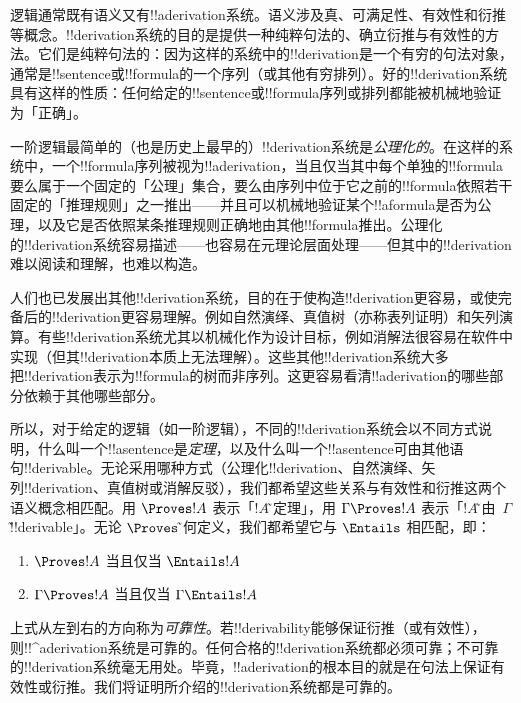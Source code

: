 \documentclass[../../../include/open-logic-section]{subfiles}
\begin{document}
      {}
      {}


逻辑通常既有语义又有!!a{derivation}系统。语义涉及真、可满足性、有效性和衍推等概念。!!{derivation}系统的目的是提供一种纯粹句法的、确立衍推与有效性的方法。它们是纯粹句法的：因为这样的系统中的!!{derivation}是一个有穷的句法对象，通常是!!{sentence}或!!{formula}的一个序列（或其他有穷排列）。好的!!{derivation}系统具有这样的性质：任何给定的!!{sentence}或!!{formula}序列或排列都能被机械地验证为「正确」。

一阶逻辑最简单的（也是历史上最早的）!!{derivation}系统是\emph{公理化的}。在这样的系统中，一个!!{formula}序列被视为!!a{derivation}，当且仅当其中每个单独的!!{formula}要么属于一个固定的「公理」集合，要么由序列中位于它之前的!!{formula}依照若干固定的「推理规则」之一推出——并且可以机械地验证某个!!a{formula}是否为公理，以及它是否依照某条推理规则正确地由其他!!{formula}推出。公理化的!!{derivation}系统容易描述——也容易在元理论层面处理——但其中的!!{derivation}难以阅读和理解，也难以构造。

人们也已发展出其他!!{derivation}系统，目的在于使构造!!{derivation}更容易，或使完备后的!!{derivation}更容易理解。例如自然演绎、真值树（亦称表列证明）和矢列演算。有些!!{derivation}系统尤其以机械化作为设计目标，例如消解法很容易在软件中实现（但其!!{derivation}本质上无法理解）。这些其他!!{derivation}系统大多把!!{derivation}表示为!!{formula}的树而非序列。这更容易看清!!a{derivation}的哪些部分依赖于其他哪些部分。

所以，对于给定的逻辑（如一阶逻辑），不同的!!{derivation}系统会以不同方式说明，什么叫一个!!a{sentence}是\emph{定理}，以及什么叫一个!!a{sentence}可由其他语句!!{derivable}。无论采用哪种方式（公理化!!{derivation}、自然演绎、矢列!!{derivation}、真值树或消解反驳），我们都希望这些关系与有效性和衍推这两个语义概念相匹配。用 $\Proves !A$ 表示「$!A$\~是定理」，用 $\Gamma \Proves !A$ 表示「$!A$\~可由~$\Gamma$\~!!{derivable}」。无论 $\Proves$\~如何定义，我们都希望它与 $\Entails$ 相匹配，即：
\begin{enumerate}
\item $\Proves !A$ 当且仅当 $\Entails !A$
\item $\Gamma \Proves !A$ 当且仅当 $\Gamma \Entails !A$
\end{enumerate}
上式从左到右的方向称为\emph{可靠性}。若!!{derivability}能够保证衍推（或有效性），则!!^a{derivation}系统是可靠的。任何合格的!!{derivation}系统都必须可靠；不可靠的!!{derivation}系统毫无用处。毕竟，!!a{derivation}的根本目的就是在句法上保证有效性或衍推。我们将证明所介绍的!!{derivation}系统都是可靠的。
\end{document}

